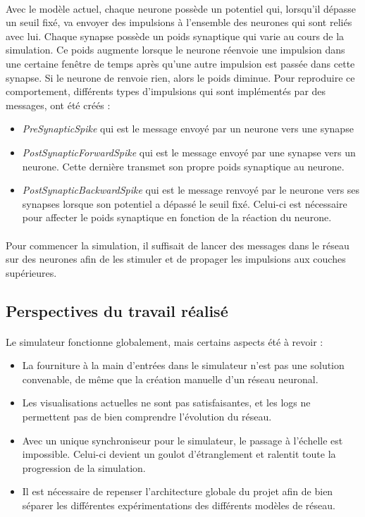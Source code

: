 \documentclass[a4paper,10pt]{article}
\begin{document}
\paragraph{}
Avec le modèle actuel, chaque neurone possède un potentiel qui, lorsqu'il dépasse un seuil fixé, va envoyer des impulsions à l'ensemble des neurones qui sont reliés avec lui. Chaque synapse possède un poids synaptique qui varie au cours de la simulation. Ce poids augmente lorsque le neurone réenvoie une impulsion dans une certaine fenêtre de temps après qu'une autre impulsion est passée dans cette synapse. Si le neurone de renvoie rien, alors le poids diminue. Pour reproduire ce comportement, différents types d'impulsions qui sont implémentés par des messages, ont été créés : 
\begin{itemize}
\item \emph{PreSynapticSpike} qui est le message envoyé par un neurone vers une synapse
\item \emph{PostSynapticForwardSpike} qui est le message envoyé par une synapse vers un neurone. Cette dernière transmet son propre poids synaptique au neurone.
\item \emph{PostSynapticBackwardSpike} qui est le message renvoyé par le neurone vers ses synapses lorsque son potentiel a dépassé le seuil fixé. Celui-ci est nécessaire pour affecter le poids synaptique en fonction de la réaction du neurone.
\end{itemize}

\paragraph{}
Pour commencer la simulation, il suffisait de lancer des messages dans le réseau sur des neurones afin de les stimuler et de propager les impulsions aux couches supérieures.

\newpage
\subsection{Perspectives du travail réalisé}
\paragraph{}
Le simulateur fonctionne globalement, mais certains aspects été à revoir :
\begin{itemize}
\item La fourniture à la main d’entrées dans le simulateur n’est pas une solution convenable, de même que la création manuelle d’un réseau neuronal.
\item Les visualisations actuelles ne sont pas satisfaisantes, et les logs ne permettent pas de bien comprendre l’évolution du réseau.
\item Avec un unique synchroniseur pour le simulateur, le passage à l’échelle est impossible. Celui-ci devient un goulot d’étranglement et ralentit toute la progression de la simulation.
\item Il est nécessaire de repenser l'architecture globale du projet afin de bien séparer les différentes expérimentations des différents modèles de réseau.
\end{itemize}
\end{document}
